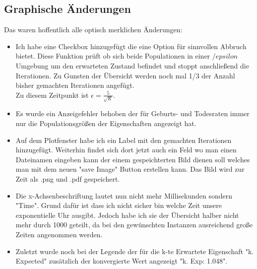 \documentclass{article}
\begin{document}
\subsection{Graphische Änderungen}
Das waren hoffentlich alle optisch merklichen Änderungen:
\begin{itemize}
\item Ich habe eine Checkbox hinzugefügt die eine Option für sinnvollen Abbruch bietet. Diese Funktion prüft ob sich beide Populationen in einer $/epsilon$ Umgebung um den erwarteten Zustand befindet und stoppt anschließend die Iterationen. Zu Gunsten der Übersicht werden noch mal 1/3 der Anzahl bisher gemachten Iterationen angefügt.\\
Zu diesem Zeitpunkt ist $\epsilon = \frac{5}{\sqrt{K}}$.
\item Es wurde ein Anzeigefehler behoben der für Geburts- und Todesraten immer nur die Populationsgrößen der Eigenschaften angezeigt hat.
\item Auf dem Plotfenster habe ich ein Label mit den gemachten Iterationen hinzugefügt. Weiterhin findet sich dort jetzt auch ein Feld wo man einen Dateinamen eingeben kann der einem gespeichterten Bild dienen soll welches man mit dem neuen "{}save Image"{} Button erstellen kann. Das Bild wird zur Zeit als .png und .pdf gespeichert.
\item Die x-Achsenbeschriftung lautet nun nicht mehr Millisekunden sondern "{}Time"{}. Grund dafür ist dass ich nicht sicher bin welche Zeit unsere exponentielle Uhr ausgibt. Jedoch habe ich sie der Übersicht halber nicht mehr durch 1000 geteilt, da bei den gewünschten Instanzen ausreichend große Zeiten angenommen werden.
\item Zuletzt wurde noch bei der Legende der für die k-te Erwartete Eigenschaft "{}k. Expected"{} zusätzlich der konvergierte Wert angezeigt "{}k. Exp: 1.048"{}.
\end{itemize}
\end{document}
